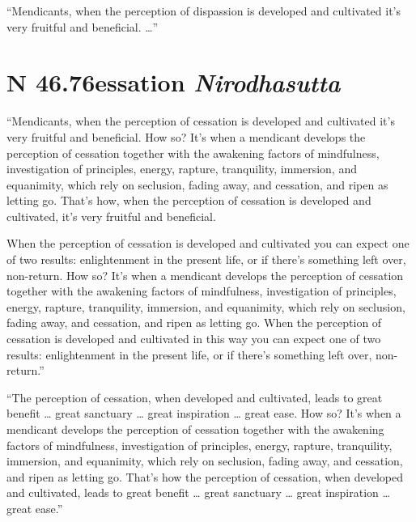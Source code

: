 \documentclass[12pt,openany]{book}%
\let\oldcontentsline\contentsline
\newcommand{\nopagecontentsline}[3]{\oldcontentsline{#1}{#2}{}}
\newcommand*{\suttatitleacronym}[1]{\smaller[2]{#1}\vspace*{.3em}}
\newcommand*{\suttatitletranslation}[1]{\linebreak{#1}}
\newcommand*{\suttatitleroot}[1]{\linebreak\smaller[2]\itshape{#1}}
\newcommand*{\tocacronym}[1]{\hspace*{-3.3em}{#1}\quad}
\newcommand*{\toctranslation}[1]{#1}
\newcommand*{\tocroot}[1]{(\textit{#1})}
\begin{document}
“Mendicants, when the perception of dispassion is developed and cultivated it’s very fruitful and beneficial. …” 

%
\section*{{\suttatitleacronym SN 46.76}{\suttatitletranslation Cessation }{\suttatitleroot Nirodhasutta}}
\addcontentsline{toc}{section}{\tocacronym{SN 46.76} \toctranslation{Cessation } \tocroot{Nirodhasutta}}

“Mendicants, when the perception of cessation is developed and cultivated it’s very fruitful and beneficial. How so? It’s when a mendicant develops the perception of cessation together with the awakening factors of mindfulness, investigation of principles, energy, rapture, tranquility, immersion, and equanimity, which rely on seclusion, fading away, and cessation, and ripen as letting go. That’s how, when the perception of cessation is developed and cultivated, it’s very fruitful and beneficial. 

When the perception of cessation is developed and cultivated you can expect one of two results: enlightenment in the present life, or if there’s something left over, non-return. How so? It’s when a mendicant develops the perception of cessation together with the awakening factors of mindfulness, investigation of principles, energy, rapture, tranquility, immersion, and equanimity, which rely on seclusion, fading away, and cessation, and ripen as letting go. When the perception of cessation is developed and cultivated in this way you can expect one of two results: enlightenment in the present life, or if there’s something left over, non-return.” 

“The perception of cessation, when developed and cultivated, leads to great benefit … great sanctuary … great inspiration … great ease. How so? It’s when a mendicant develops the perception of cessation together with the awakening factors of mindfulness, investigation of principles, energy, rapture, tranquility, immersion, and equanimity, which rely on seclusion, fading away, and cessation, and ripen as letting go. That’s how the perception of cessation, when developed and cultivated, leads to great benefit … great sanctuary … great inspiration … great ease.” 

%
\end{document}

